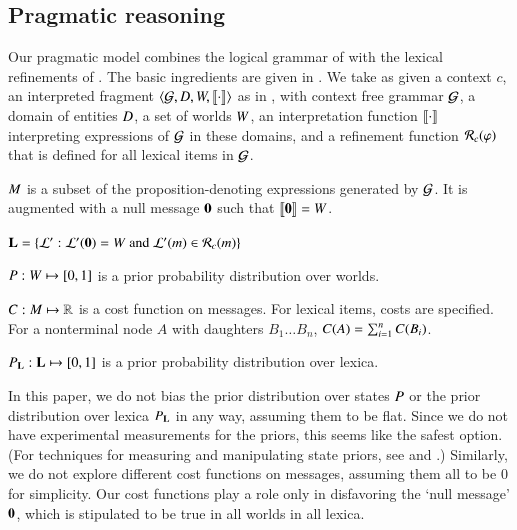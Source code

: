 \documentclass[leqno,12pt]{article}
\begin{document}

\subsection{Pragmatic reasoning}\label{sec:agents}

Our pragmatic model combines the logical grammar of
 with the lexical refinements of
. The basic ingredients are given in
. We take as given a context $c$, an interpreted
fragment $\langle \mathcal{G}, D, W, \llbracket\cdot\rrbracket \rangle$ as in
, with context free grammar $\mathcal{G}$, a domain
of entities $D$, a set of worlds $W$, an interpretation
function $\llbracket\cdot\rrbracket$ interpreting expressions of $\mathcal{G}$ in these
domains, and a refinement function $\mathcal{R}_{c}(\varphi)$ that is defined
for all lexical items in $\mathcal{G}$.
%
\begin{examples}
\item\label{modobjects}
  \begin{examples}
  \item\label{messages} $M$ is a subset of the
    proposition-denoting expressions generated by $\mathcal{G}$. It is
    augmented with a null message $\mathbf{0}$ such that
    $\llbracket\mathbf{0}\rrbracket = W$.

  \item\label{lexset}%
    $\mathbf{L} = \left\{ \mathcal{L}' : \mathcal{L}'(\mathbf{0}) = W \text{ and } \mathcal{L}'(m) \in \mathcal{R}_{c}(m) \right\}$             
  
  \item $P : W \mapsto [0,1]$ is a prior probability
    distribution over worlds.

  \item $C : M \mapsto \mathbb{R}$ is a cost function on
    messages.  For lexical items, costs are specified. For a
    nonterminal node $A$ with daughters $B_{1} \ldots B_{n}$,
    $C(A) = \sum_{i=1}^{n}C(B_{i})$.

  \item $P_{\mathbf{L}} : \mathbf{L} \mapsto [0,1]$ is a prior probability
    distribution over lexica.
  \end{examples}
\end{examples}

In this paper, we do not bias the prior distribution over states
$P$ or the prior distribution over lexica $P_{\mathbf{L}}$ in any
way, assuming them to be flat. Since we do not have experimental
measurements for the priors, this seems like the safest option. (For
techniques for measuring and manipulating state priors, see
\citealt{Frank:Goodman:2012} and
\citealt{Stiller:Goodman:Frank:2011}.)  Similarly, we do not explore
different cost functions on messages, assuming them all to be $0$ for
simplicity. Our cost functions play a role only in disfavoring the
`null message' $\mathbf{0}$, which is stipulated to be true in all
worlds in all lexica.
\end{document}
